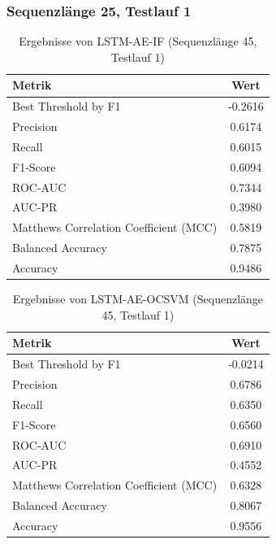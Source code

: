 \documentclass[a4paper,12pt]{article}
\begin{document}
\subsubsection{Sequenzlänge 25, Testlauf 1}
\begin{table}[H]
	\centering
	\caption{Ergebnisse von LSTM-AE-IF (Sequenzlänge 45, Testlauf 1)}
	\begin{tabular}{lc}
		\hline
		Metrik & Wert \\
		\hline
		Best Threshold by F1 & -0.2616 \\
		Precision & 0.6174 \\
		Recall & 0.6015 \\
		F1-Score & 0.6094 \\
		ROC-AUC & 0.7344 \\
		AUC-PR & 0.3980 \\
		Matthews Correlation Coefficient (MCC) & 0.5819 \\
		Balanced Accuracy & 0.7875 \\
		Accuracy & 0.9486 \\
		\hline
	\end{tabular}
\end{table}

\begin{table}[H]
	\centering
	\caption{Ergebnisse von LSTM-AE-OCSVM (Sequenzlänge 45, Testlauf 1)}
	\begin{tabular}{lc}
		\hline
		Metrik & Wert \\
		\hline
		Best Threshold by F1 & -0.0214 \\
		Precision & 0.6786 \\
		Recall & 0.6350 \\
		F1-Score & 0.6560 \\
		ROC-AUC & 0.6910 \\
		AUC-PR & 0.4552 \\
		Matthews Correlation Coefficient (MCC) & 0.6328 \\
		Balanced Accuracy & 0.8067 \\
		Accuracy & 0.9556 \\
		\hline
	\end{tabular}
\end{table}
\end{document}
